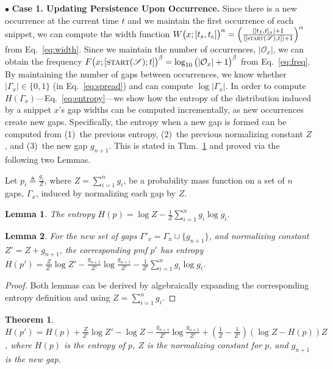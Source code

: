 \documentclass[sigconf]{acmart}
\newtheorem{lemma}{Lemma}
\newtheorem{theorem}{Theorem}
\newcommand{\timestamp}{t}
\newcommand{\stream}{\mathscr{S}}
\newcommand{\streamStart}{\textsc{start}(\stream)}
\newcommand{\pattern}{x}
\newcommand{\x}{x}
\newcommand{\intervalStart}{t_s}
\newcommand{\intervalEnd}{t_e}
\newcommand{\interval}{[\intervalStart, \intervalEnd]}
\newcommand{\occs}{\mathcal{O}}
\newcommand{\firstOcc}{t_f}
\newcommand{\freq}{F}
\newcommand{\width}{W}
\newcommand{\widthLong}{\width\big(\pattern; \interval\big)}
\newcommand{\entropy}{H}
\newcommand{\gaps}{\Gamma}
\newcommand{\gap}{g}
\newcommand{\wExp}{\alpha}
\newcommand{\fExp}{\beta}
\begin{document}
$\bullet$ \textbf{Case 1. Updating Persistence Upon Occurrence.} 
Since there is a new occurrence at the current time $\timestamp$ and we maintain the first occurrence of each snippet, we can compute the width function $\widthLong^\wExp = \left(\frac{|[\firstOcc, \timestamp]_\pattern| + 1}{|[\streamStart,\timestamp]| + 1}\right)^\wExp$ from Eq.~\eqref{eq:width}. Since we maintain the number of occurrences, $|\occs_\pattern|$, we can obtain the frequency  $\freq\big(\pattern;[\streamStart;\timestamp]\big)^\fExp = \log_{10}\big(|\occs_\pattern| + 1\big)^\fExp$ from Eq.~\eqref{eq:freq}. By maintaining the number of gaps between occurrences, we know whether $|\gaps_\pattern| \in \{0, 1\}$ (in Eq.~\eqref{eq:spread}) and can compute $\log|\gaps_\pattern|$. In order to compute $\entropy(\gaps_\pattern)$---Eq.~\eqref{eq:entropy}---we show how the entropy 
of the distribution induced by a snippet $\pattern$'s gap widths
can be computed incrementally, as new occurrences create new gaps. 
Specifically, the entropy 
when a new gap is formed can be computed from (1)~the previous entropy,
(2)~the previous normalizing constant $Z$,
and (3)~the new gap $\gap_{n+1}$.
This is stated in Thm.~\ref{thm:entropy-incremental} and proved via the following two Lemmas. 

Let $p_i \triangleq \frac{\gap_i}{Z}$, where $Z = \sum_{i=1}^n \gap_i$, be a probability mass function on a set of $n$ gaps, $\gaps_\x$, induced by normalizing each gap by $Z$.
\begin{lemma}
    \label{lemma:entropy-n}
    The entropy $\entropy(p) = \log Z - \frac{1}{Z}\sum_{i=1}^n \gap_i\log \gap_i.$
\end{lemma}

\begin{lemma}
    \label{lemma:entropy-n-1}
    For the new set of gaps ${\gaps'}_\x = \gaps_\x \cup \{\gap_{n+1}\}$, and normalizing constant $Z' = Z + \gap_{n+1}$, the corresponding pmf $p'$ has entropy $\entropy(p') = \frac{Z}{Z'}\log Z' -\frac{\gap_{n+1}}{Z'}\log\frac{\gap_{n+1}}{Z'} - \frac{1}{Z'}\sum_{i=1}^n \gap_i\log \gap_i$.
\end{lemma}

\begin{proof}
    Both lemmas can be derived by algebraically expanding the corresponding entropy definition and using $Z = \sum_{i=1}^n \gap_i$. 
\end{proof}

\begin{theorem}
    \label{thm:entropy-incremental}
    $\entropy(p') = \entropy(p) + \frac{Z}{Z'}\log Z' -\log Z -\frac{\gap_{n+1}}{Z'}\log\frac{\gap_{n+1}}{Z'} + \left(\frac{1}{Z}-\frac{1}{Z'}\right)(\log Z - \entropy(p))Z$, where $\entropy(p)$ is the entropy of $p$, $Z$ is the normalizing constant for $p$, and $\gap_{n+1}$ is the new gap.
\end{theorem}
\end{document}
